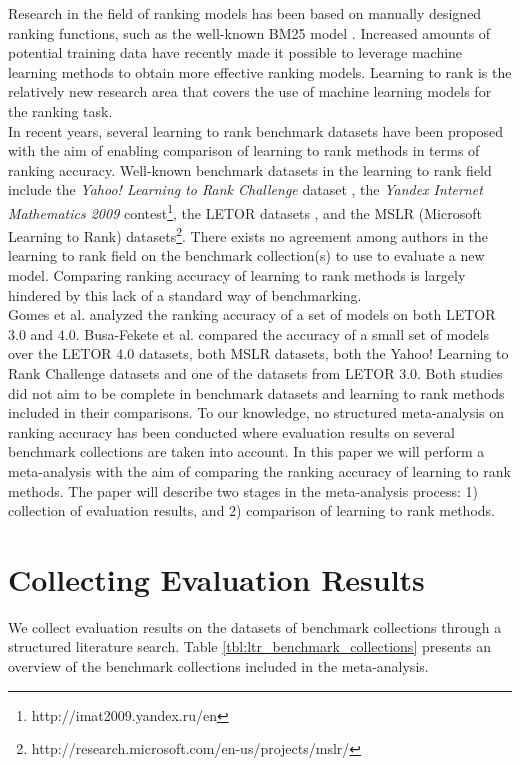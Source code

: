 \documentclass{sig-alternate}
\begin{document}
Research in the field of ranking models has been based on manually designed ranking functions, such as the well-known BM25 model \cite{Robertson1994}. Increased amounts of potential training data have recently made it possible to leverage machine learning methods to obtain more effective ranking models. Learning to rank is the relatively new research area that covers the use of machine learning models for the ranking task.\\

In recent years, several learning to rank benchmark datasets have been proposed with the aim of enabling comparison of learning to rank methods in terms of ranking accuracy. Well-known benchmark datasets in the learning to rank field include the \emph{Yahoo! Learning to Rank Challenge} dataset \cite{Chapelle2011a}, the \emph{Yandex Internet Mathematics 2009} contest\footnote{http://imat2009.yandex.ru/en}, the LETOR datasets \cite{Qin2010}, and the MSLR (Microsoft Learning to Rank) datasets\footnote{http://research.microsoft.com/en-us/projects/mslr/}. There exists no agreement among authors in the learning to rank field on the benchmark collection(s) to use to evaluate a new model. Comparing ranking accuracy of learning to rank methods is largely hindered by this lack of a standard way of benchmarking.\\

Gomes et al. \cite{Gomes2013} analyzed the ranking accuracy of a set of models on both LETOR 3.0 and 4.0. Busa-Fekete et al. \cite{Busa-Fekete2013} compared the accuracy of a small set of models over the LETOR 4.0 datasets, both MSLR datasets, both the Yahoo! Learning to Rank Challenge datasets and one of the datasets from LETOR 3.0. Both studies did not aim to be complete in benchmark datasets and learning to rank methods included in their comparisons. To our knowledge, no structured meta-analysis on ranking accuracy has been conducted where evaluation results on several benchmark collections are taken into account. In this paper we will perform a meta-analysis with the aim of comparing the ranking accuracy of learning to rank methods. The paper will describe two stages in the meta-analysis process: 1) collection of evaluation results, and 2) comparison of learning to rank methods.

\section{Collecting Evaluation Results}
\label{sec:collecting_evaluation_results}
We collect evaluation results on the datasets of benchmark collections through a structured literature search. Table \ref{tbl:ltr_benchmark_collections} presents an overview of the benchmark collections included in the meta-analysis.
\end{document}
